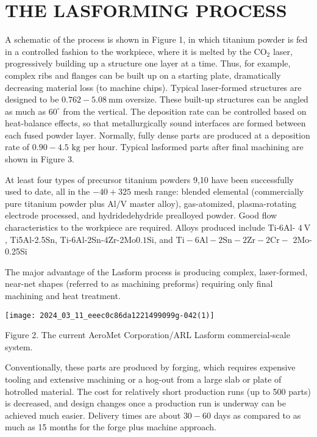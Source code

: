 \documentclass[10pt]{article}
\begin{document}
\section*{THE LASFORMING PROCESS}
A schematic of the process is shown in Figure 1, in which titanium powder is fed in a controlled fashion to the workpiece, where it is melted by the $\mathrm{CO}_{2}$ laser, progressively building up a structure one layer at a time. Thus, for example, complex ribs and flanges can be built up on a starting plate, dramatically decreasing material loss (to machine chips). Typical laser-formed structures are designed to be $0.762-5.08 \mathrm{~mm}$ oversize. These built-up structures can be angled as much as $60^{\circ}$ from the vertical. The deposition rate can be controlled based on heat-balance effects, so that metallurgically sound interfaces are formed between each fused powder layer. Normally, fully dense parts are produced at a deposition rate of $0.90-4.5$ $\mathrm{kg}$ per hour. Typical lasformed parts after final machining are shown in Figure 3.

At least four types of precursor titanium powders 9,10 have been successfully used to date, all in the $-40+325$ mesh range: blended elemental (commercially pure titanium powder plus $\mathrm{Al} / \mathrm{V}$ master alloy), gas-atomized, plasma-rotating electrode processed, and hydridedehydride prealloyed powder. Good flow characteristics to the workpiece are required. Alloys produced include Ti-6Al- $4 \mathrm{~V}$, Ti5Al-2.5Sn, Ti-6Al-2Sn-4Zr-2Mo$0.1 \mathrm{Si}$, and $\mathrm{Ti}-6 \mathrm{Al}-2 \mathrm{Sn}-2 \mathrm{Zr}-2 \mathrm{Cr}-$ 2Mo-0.25Si

The major advantage of the Lasform process is producing complex, laser-formed, near-net shapes (referred to as machining preforms) requiring only final machining and heat treatment.

\begin{center}
\texttt{[image: 2024\_03\_11\_eeec0c86da1221499099g-042(1)]}
\end{center}

Figure 2. The current AeroMet Corporation/ARL Lasform commercial-scale system.

Conventionally, these parts are produced by forging, which requires expensive tooling and extensive machining or a hog-out from a large slab or plate of hotrolled material. The cost for relatively short production runs (up to 500 parts) is decreased, and design changes once a production run is underway can be achieved much easier. Delivery times are about $30-60$ days as compared to as much as 15 months for the forge plus machine approach.
\end{document}
